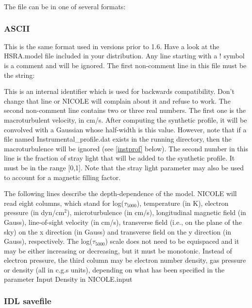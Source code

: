 The file can be in one of several formats:

\subsubsection{ASCII}

This is the same format used in versions prior to 1.6. Have a look at
the HSRA.model file included in your distribution.  Any line starting
with a ! symbol is a comment and will be ignored.  The first
non-comment line in this file must be the string:

\vskip12pt
\vskip12pt

This is an internal identifier which is used for backwards
compatibility.  Don't change that line or NICOLE will complain about
it and refuse to work.  The second non-comment line contains two or
three real numbers. The first one is the macroturbulent velocity, in
cm/s. After computing the synthetic profile, it will be convolved with
a Gaussian whose half-width is this value. However, note that if a
file named Instrumental\_profile.dat exists in the running directory,
then the macroturbulence will be ignored (see \ref{instprof}
below). The second 
number in this line is the fraction of stray light that will be added
to the synthetic profile. It must be in the range [0,1]. Note that the
stray light parameter may also be used to account for a magnetic
filling factor. 

The following lines describe the depth-dependence of the model.
NICOLE will read eight columns, which stand for log($\tau_{5000}$),
temperature (in K), electron pressure (in dyn/cm$^2$), microturbulence
(in cm/s), longitudinal magnetic field (in Gauss), line-of-sight
velocity (in cm/s), transverse field (i.e., on the plane of the sky)
on the x direction (in Gauss) and transverse field on the y direction
(in Gauss), respectively.  The log($\tau_{5000}$) scale does not need
to be equispaced and it may be either increasing or decreasing, but it
must be monotonic. Instead of electron pressure, the third column may
be electron number density, gas pressure or density (all in c.g.s
units), depending on what has been specified in the parameter Input
Density in NICOLE.input

\subsubsection{IDL savefile}

